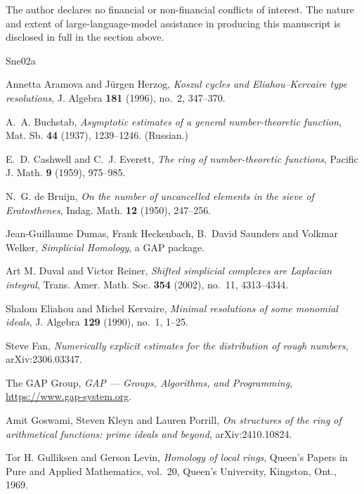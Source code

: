 \documentclass[a4paper,11pt,oneside,reqno]{amsart}
\theoremstyle{definition}
\theoremstyle{remark}
\theoremstyle{plain}
\begin{document}
The author declares no financial or non-financial conflicts of interest. The
nature and extent of large-language-model assistance in producing this
manuscript is disclosed in full in the section above.

\begin{thebibliography}{Sne02a}

Annetta Aramova and Jürgen Herzog,
\emph{Koszul cycles and Eliahou--Kervaire type resolutions},
J. Algebra \textbf{181} (1996), no.~2, 347--370.

A.~A. Buchstab,
\emph{Asymptotic estimates of a general number-theoretic function},
Mat. Sb. \textbf{44} (1937), 1239--1246. (Russian.)

E.~D. Cashwell and C.~J. Everett,
\emph{The ring of number-theoretic functions},
Pacific J. Math. \textbf{9} (1959), 975--985.

N.~G. de Bruijn,
\emph{On the number of uncancelled elements in the sieve of Eratosthenes},
Indag. Math. \textbf{12} (1950), 247--256.

Jean-Guillaume Dumas, Frank Heckenbach, B.~David Saunders and Volkmar Welker,
\emph{Simplicial Homology}, a \textsf{GAP} package.

Art M. Duval and Victor Reiner,
\emph{Shifted simplicial complexes are Laplacian integral},
Trans. Amer. Math. Soc. \textbf{354} (2002), no.~11, 4313--4344.

Shalom Eliahou and Michel Kervaire,
\emph{Minimal resolutions of some monomial ideals},
J. Algebra \textbf{129} (1990), no.~1, 1--25.

Steve Fan,
\emph{Numerically explicit estimates for the distribution of rough numbers},
arXiv:2306.03347.

The GAP Group,
\emph{GAP --- Groups, Algorithms, and Programming},
\url{https://www.gap-system.org}.

Amit Goswami, Steven Kleyn and Lauren Porrill,
\emph{On structures of the ring of arithmetical functions: prime ideals and
beyond}, arXiv:2410.10824.

Tor H. Gulliksen and Gerson Levin,
\emph{Homology of local rings},
Queen's Papers in Pure and Applied Mathematics, vol.~20, Queen's University,
Kingston, Ont., 1969.


\end{thebibliography}
\end{document}
